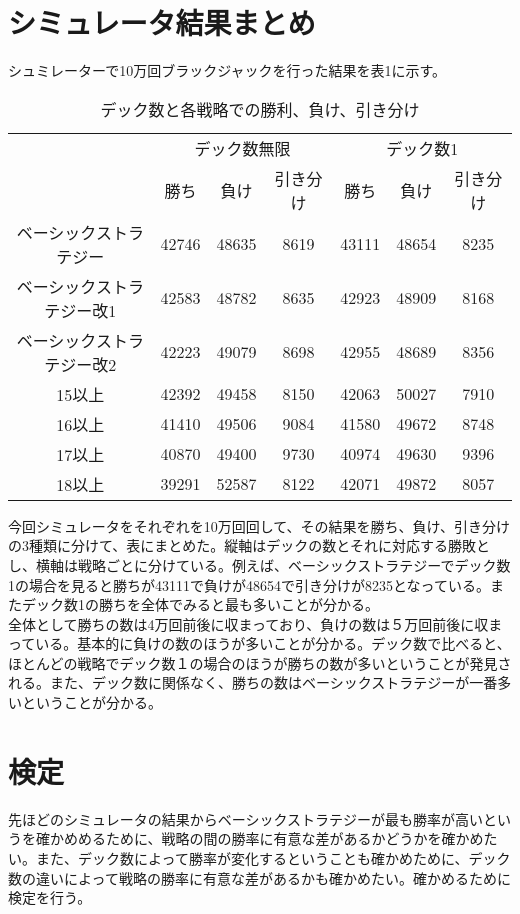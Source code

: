 \section{シミュレータ結果まとめ}
シュミレーターで10万回ブラックジャックを行った結果を表1に示す。
\begin{table}[H]
 \begin{center}
  \begin{tabular}{|c|c|c|c|c|c|c|}
    \hline
     & \multicolumn{3}{c|}{デック数無限} & \multicolumn{3}{c|}{デック数1} \\
    \cline{2-7} & 勝ち & 負け & 引き分け & 勝ち & 負け & 引き分け \\
    \hline ベーシックストラテジー & 42746 & 48635 & 8619 & 43111 & 48654 & 8235 \\
    \hline ベーシックストラテジー改1 & 42583 & 48782 & 8635 & 42923 & 48909 & 8168 \\
    \hline ベーシックストラテジー改2 & 42223 & 49079 & 8698 & 42955 & 48689 & 8356 \\
    \hline 15以上 & 42392 & 49458 & 8150 & 42063 & 50027 & 7910 \\
    \hline 16以上 & 41410 & 49506 & 9084 & 41580 & 49672 & 8748 \\
    \hline 17以上 & 40870 & 49400 & 9730 & 40974 & 49630 & 9396 \\
    \hline 18以上 & 39291 & 52587 & 8122 & 42071 & 49872 & 8057 \\
    \hline
  \end{tabular}
 \end{center}
 \caption{デック数と各戦略での勝利、負け、引き分け}
\end{table}
今回シミュレータをそれぞれを10万回回して、その結果を勝ち、負け、引き分けの3種類に分けて、表にまとめた。縦軸はデックの数とそれに対応する勝敗とし、横軸は戦略ごとに分けている。例えば、ベーシックストラテジーでデック数1の場合を見ると勝ちが43111で負けが48654で引き分けが8235となっている。またデック数1の勝ちを全体でみると最も多いことが分かる。\\
全体として勝ちの数は4万回前後に収まっており、負けの数は５万回前後に収まっている。基本的に負けの数のほうが多いことが分かる。デック数で比べると、ほとんどの戦略でデック数１の場合のほうが勝ちの数が多いということが発見される。また、デック数に関係なく、勝ちの数はベーシックストラテジーが一番多いということが分かる。
\section{検定}
先ほどのシミュレータの結果からベーシックストラテジーが最も勝率が高いというを確かめめるために、戦略の間の勝率に有意な差があるかどうかを確かめたい。また、デック数によって勝率が変化するということも確かめために、デック数の違いによって戦略の勝率に有意な差があるかも確かめたい。確かめるために検定を行う。
